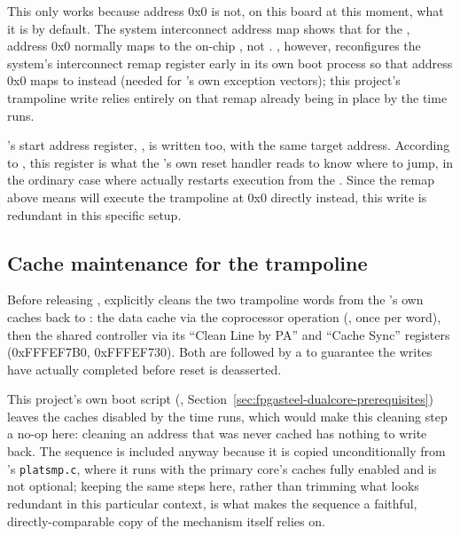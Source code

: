 This only works because address 0x0 is not, on this board at this moment, what it is by default. The system interconnect address map \cite[Chapter 8, Figure 8-4, p.~8-6]{CV-TRM} shows that for the , address 0x0 normally maps to the on-chip , not . , however, reconfigures the system's interconnect remap register early in its own boot process so that address 0x0 maps to  instead (needed for 's own exception vectors); this project's trampoline write relies entirely on that remap already being in place by the time  runs.

's start address register, , is written too, with the same target address. According to \cite[Chapter 6, ``'', p.~6-7]{CV-TRM}, this register is what the 's own reset handler reads to know where to jump, in the ordinary case where  actually restarts execution from the . Since the remap above means  will execute the trampoline at 0x0 directly instead, this write is redundant in this specific setup.

\subsection{Cache maintenance for the trampoline}
\label{subsec:fpgasteel-dualcore-cache-maintenance}

Before releasing ,  explicitly cleans the two trampoline words from the 's own caches back to : the  data cache via the  coprocessor operation (, once per word), then the shared   controller via its ``Clean Line by PA'' and ``Cache Sync'' registers (0xFFFEF7B0, 0xFFFEF730). Both are followed by a  to guarantee the writes have actually completed before reset is deasserted.

This project's own boot script (, Section~\ref{sec:fpgasteel-dualcore-prerequisites}) leaves the caches disabled by the time  runs, which would make this cleaning step a no-op here: cleaning an address that was never cached has nothing to write back. The sequence is included anyway because it is copied unconditionally from 's \texttt{platsmp.c}, where it runs with the primary core's caches fully enabled and is not optional; keeping the same steps here, rather than trimming what looks redundant in this particular context, is what makes the sequence a faithful, directly-comparable copy of the mechanism  itself relies on.

